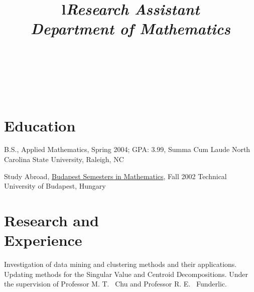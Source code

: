 \documentclass[margin,line,11pt,draft]{res}
\begin{document}
\begin{resume}
\begin{format}
\title{l}\\
\\
\body\\
\end{format}
\section{\sc Education}
B.S., Applied Mathematics, Spring 2004; GPA: 3.99, Summa Cum Laude \newline
North Carolina State University, Raleigh, NC

Study Abroad, \href{http://www.stolaf.edu/depts/math/budapest/}
{Budapest Semesters in Mathematics}, Fall 2002 \newline
Technical University of Budapest, Hungary
\section{\sc Research and \\Experience}

\title{\em Research Assistant \\ Department of Mathematics}
\location{}
\begin{position}
Investigation of data mining and clustering methods and their
applications. Updating methods for the Singular Value and Centroid
Decompositions. Under the supervision of Professor M. T. \ Chu and
Professor R. E. \ Funderlic.
\end{position}


\end{resume}
\end{document}
